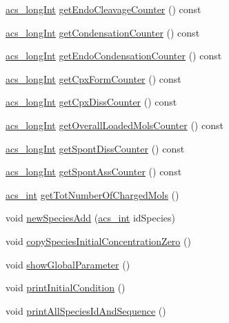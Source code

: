 \begin{DoxyCompactItemize}
\hyperlink{a00050_a19319d75f02db4308bc5c0026d98cd85}{acs\+\_\+long\+Int} \hyperlink{a00013_aa2ded3c5ba8c4ce41ee86399dc616d4a}{get\+Endo\+Cleavage\+Counter} () const 
\item 
\hyperlink{a00050_a19319d75f02db4308bc5c0026d98cd85}{acs\+\_\+long\+Int} \hyperlink{a00013_a0fc62131bf552c2a995c7ddc461828cd}{get\+Condensation\+Counter} () const 
\item 
\hyperlink{a00050_a19319d75f02db4308bc5c0026d98cd85}{acs\+\_\+long\+Int} \hyperlink{a00013_aaa23d550cfa37344dd3bb4d5767e6ea0}{get\+Endo\+Condensation\+Counter} () const 
\item 
\hyperlink{a00050_a19319d75f02db4308bc5c0026d98cd85}{acs\+\_\+long\+Int} \hyperlink{a00013_a5d72675f37c3936c58d27480613a9ab6}{get\+Cpx\+Form\+Counter} () const 
\item 
\hyperlink{a00050_a19319d75f02db4308bc5c0026d98cd85}{acs\+\_\+long\+Int} \hyperlink{a00013_abf2f63b22c52e17f6089f098651584b8}{get\+Cpx\+Diss\+Counter} () const 
\item 
\hyperlink{a00050_a19319d75f02db4308bc5c0026d98cd85}{acs\+\_\+long\+Int} \hyperlink{a00013_a75329459280bc79537a5c08883449a63}{get\+Overall\+Loaded\+Mols\+Counter} () const 
\item 
\hyperlink{a00050_a19319d75f02db4308bc5c0026d98cd85}{acs\+\_\+long\+Int} \hyperlink{a00013_a914378e80f148a4b24fc8e27ebb02198}{get\+Spont\+Diss\+Counter} () const 
\item 
\hyperlink{a00050_a19319d75f02db4308bc5c0026d98cd85}{acs\+\_\+long\+Int} \hyperlink{a00013_ab3c423ac69aac398c087cde1dcb0dccb}{get\+Spont\+Ass\+Counter} () const 
\item 
\hyperlink{a00050_a8d277355641a098190360234e2ebde35}{acs\+\_\+int} \hyperlink{a00013_aadb5c442d5c9d16a0d6b2e90715dda94}{get\+Tot\+Number\+Of\+Charged\+Mols} ()
\item 
void \hyperlink{a00013_a4721ebd79c1f52a583fd60ff8f2ece2c}{new\+Species\+Add} (\hyperlink{a00050_a8d277355641a098190360234e2ebde35}{acs\+\_\+int} id\+Species)
\item 
void \hyperlink{a00013_a375fc2dc0afc38a8a3afbd016acc4983}{copy\+Species\+Initial\+Concentration\+Zero} ()
\item 
void \hyperlink{a00013_af959a6b6a72cb6226fef7f0e7fab5c0c}{show\+Global\+Parameter} ()
\item 
void \hyperlink{a00013_a429c2529badaeda72e553f500b990e11}{print\+Initial\+Condition} ()
\item 
void \hyperlink{a00013_a48d8fd9d8d5c9c31f0b4af87c8cbd28f}{print\+All\+Species\+Id\+And\+Sequence} ()

\end{DoxyCompactItemize}
